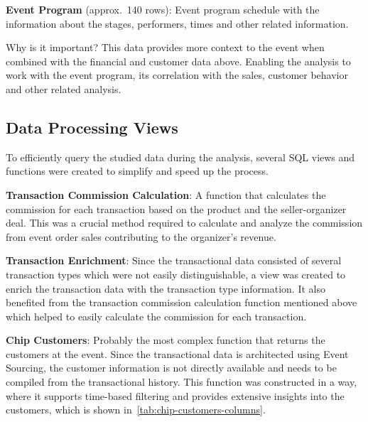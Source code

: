 \textbf{Event Program} (approx.\ 140 rows): Event program schedule with the information about the stages, performers, times and other related information.

\begin{blue-box}{Why is it important?}
	This data provides more context to the event when combined with the financial and customer data above.
	Enabling the analysis to work with the event program, its correlation with the sales, customer behavior and other related analysis.
\end{blue-box}

\subsection{Data Processing Views}
\label{subsec:data-methodology-structure-views}
To efficiently query the studied data during the analysis, several SQL views and functions were created to simplify and speed up the process.

\textbf{Transaction Commission Calculation}: A function that calculates the commission for each transaction based on the product and the seller-organizer deal.
This was a crucial method required to calculate and analyze the commission from event order sales contributing to the organizer's revenue.

\textbf{Transaction Enrichment}: Since the transactional data consisted of several transaction types which were not easily distinguishable, a view was created to enrich the transaction data with the transaction type information.
It also benefited from the transaction commission calculation function mentioned above which helped to easily calculate the commission for each transaction.

\textbf{Chip Customers}: Probably the most complex function that returns the customers at the event.
Since the transactional data is architected using Event Sourcing, the customer information is not directly available and needs to be compiled from the transactional history.
This function was constructed in a way, where it supports time-based filtering and provides extensive insights into the customers, which is shown in~\autoref{tab:chip-customers-columns}.


